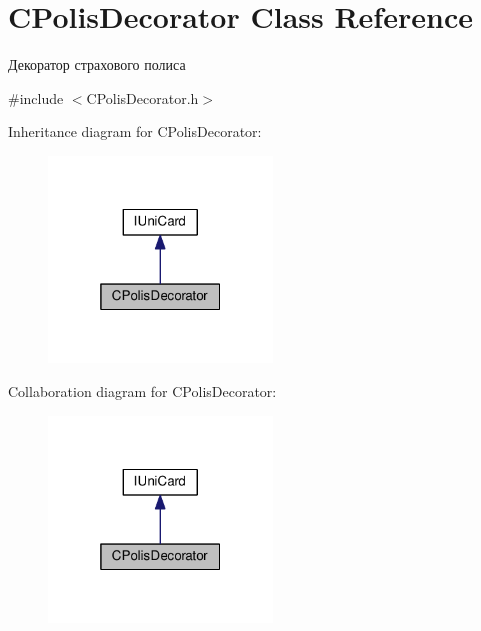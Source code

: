 \hypertarget{classCPolisDecorator}{}\section{C\+Polis\+Decorator Class Reference}
\label{classCPolisDecorator}


Декоратор страхового полиса  




{\ttfamily \#include $<$C\+Polis\+Decorator.\+h$>$}



Inheritance diagram for C\+Polis\+Decorator\+:\nopagebreak
\begin{figure}[H]
\begin{center}
\leavevmode
\includegraphics[width=169pt]{classCPolisDecorator__inherit__graph}
\end{center}
\end{figure}


Collaboration diagram for C\+Polis\+Decorator\+:\nopagebreak
\begin{figure}[H]
\begin{center}
\leavevmode
\includegraphics[width=169pt]{classCPolisDecorator__coll__graph}
\end{center}
\end{figure}
